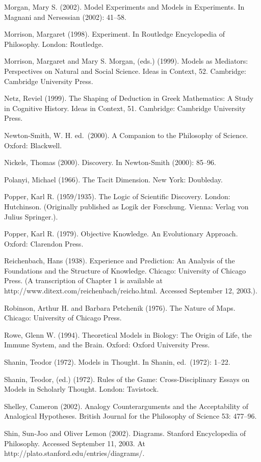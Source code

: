 Morgan, Mary S. (2002). Model Experiments and Models in Experiments. In
Magnani and Nersessian (2002): 41--58.

Morrison, Margaret (1998). Experiment. In Routledge Encyclopedia of
Philosophy. London: Routledge.

Morrison, Margaret and Mary S. Morgan, (eds.) (1999). Models as
Mediators: Perspectives on Natural and Social Science. Ideas in Context,
52. Cambridge: Cambridge University Press.

Netz, Reviel (1999). The Shaping of Deduction in Greek Mathematics: A
Study in Cognitive History. Ideas in Context, 51. Cambridge: Cambridge
University Press.

Newton-Smith, W. H. ed.~(2000). A Companion to the Philosophy of
Science. Oxford: Blackwell.

Nickels, Thomas (2000). Discovery. In Newton-Smith (2000): 85--96.

Polanyi, Michael (1966). The Tacit Dimension. New York: Doubleday.

Popper, Karl R. (1959/1935). The Logic of Scientific Discovery. London:
Hutchinson. (Originally published as Logik der Forschung. Vienna: Verlag
von Julius Springer.).

Popper, Karl R. (1979). Objective Knowledge. An Evolutionary Approach.
Oxford: Clarendon Press.

Reichenbach, Hans (1938). Experience and Prediction: An Analysis of the
Foundations and the Structure of Knowledge. Chicago: University of
Chicago Press. (A transcription of Chapter 1 is available at
http://www.ditext.com/reichenbach/reicho.html. Accessed September 12,
2003.).

Robinson, Arthur H. and Barbara Petchenik (1976). The Nature of Maps.
Chicago: University of Chicago Press.

Rowe, Glenn W. (1994). Theoretical Models in Biology: The Origin of
Life, the Immune System, and the Brain. Oxford: Oxford University Press.

Shanin, Teodor (1972). Models in Thought. In Shanin, ed.~(1972): 1--22.

Shanin, Teodor, (ed.) (1972). Rules of the Game: Cross-Disciplinary
Essays on Models in Scholarly Thought. London: Tavistock.

Shelley, Cameron (2002). Analogy Counterarguments and the Acceptability
of Analogical Hypotheses. British Journal for the Philosophy of Science
53: 477--96.

Shin, Sun-Joo and Oliver Lemon (2002). Diagrams. Stanford Encyclopedia
of Philosophy. Accessed September 11, 2003. At
http://plato.stanford.edu/entries/diagrams/.

